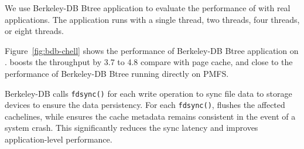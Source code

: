 We use Berkeley-DB Btree application to evaluate the performance of
\CChell{} with real applications.
The application runs with a
single thread, two threads, four threads, or eight threads. 

Figure~\ref{fig:bdb-chell} shows the performance of Berkeley-DB Btree
application on \CChell{}.  \Chell{} boosts the
throughput by 3.7\x{} to 4.8\x{} compare with page cache, and close to the
performance of Berkeley-DB Btree running directly on PMFS.

Berkeley-DB calls \texttt{fdsync()} for each
write operation to sync
file data to storage devices to ensure the data persistency.
For each \texttt{fdsync()}, \lib{} flushes the affected cachelines, while \drv{} ensures the cache metadata remains consistent in the event of a system crash.  This significantly reduces the sync latency and improves application-level performance.



